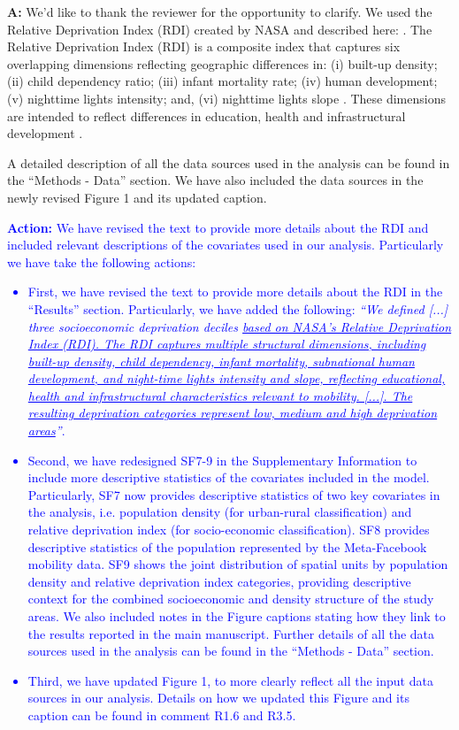 \documentclass[12pt,a4paper,oneside, reqno]{amsart}
\begin{document}
\setlength{\leftskip}{1cm}\textbf{A:} We'd like to thank the reviewer for the opportunity to clarify. We used the Relative Deprivation Index (RDI) created by NASA and described here: \parencite{RDI2022}. The Relative Deprivation Index (RDI) is a composite index that captures six overlapping dimensions reflecting geographic differences in: (i) built-up density; (ii) child dependency ratio; (iii) infant mortality rate; (iv) human development; (v) nighttime lights intensity; and, (vi) nighttime lights slope \parencite{RDI2022}. These dimensions are intended to reflect differences in education, health and infrastructural development \parencite{RDI2022}.

A detailed description of all the data sources used in the analysis can be found in the ``Methods - Data'' section. We have also included the data sources in the newly revised Figure 1 and its updated caption.

\textcolor{blue}{
\textbf{Action:} We have revised the text to provide more details about the RDI and included relevant descriptions of the covariates used in our analysis. Particularly we have take the following actions:
\begin{itemize}[noitemsep, topsep=0pt]
    \item First, we have revised the text to provide more details about the RDI in the ``Results'' section. Particularly, we have added the following: \textit{``We defined [...] three socioeconomic deprivation deciles \ul{based on NASA's Relative Deprivation Index (RDI). The RDI captures multiple structural dimensions, including built-up density, child dependency, infant mortality, subnational human development, and night-time lights intensity and slope, reflecting educational, health and infrastructural characteristics relevant to mobility. [...]. The resulting deprivation categories represent low, medium and high deprivation areas}''}.
    \item Second, we have redesigned SF7-9 in the Supplementary Information to include more descriptive statistics of the covariates included in the model. Particularly, SF7 now provides descriptive statistics of two key covariates in the analysis, i.e. population density (for urban-rural classification) and relative deprivation index (for socio-economic classification). SF8 provides descriptive statistics of the population represented by the Meta-Facebook mobility data. SF9 shows the joint distribution of spatial units by population density and relative deprivation index categories, providing descriptive context for the combined socioeconomic and density structure of the study areas. We also included notes in the Figure captions stating how they link to the results reported in the main manuscript. Further details of all the data sources used in the analysis can be found in the ``Methods - Data'' section.
    \item Third, we have updated Figure 1, to more clearly reflect all the input data sources in our analysis. Details on how we updated this Figure and its caption can be found in comment R1.6 and R3.5.
\end{itemize}
}
\end{document}
